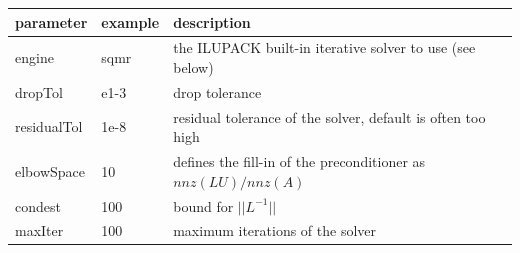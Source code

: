 \begin{center}
\begin{tabular}{llp{}}
\toprule
parameter & example & description \\
\midrule
engine & sqmr & the ILUPACK built-in iterative solver to use (see below)\\
dropTol & e1-3 & drop tolerance\\
residualTol & 1e-8 & residual tolerance of the solver, default is often too
high\\
elbowSpace & 10 & defines the fill-in of the preconditioner as
$nnz(LU)/nnz(A)$\\
condest & 100 & bound for $||L^{-1}||$ \\
maxIter & 100 & maximum iterations of the solver\\
\bottomrule
\end{tabular}
\end{center}

